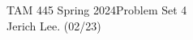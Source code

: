 \documentclass[12pt]{article}
\begin{document}
\noindent TAM 445 Spring 2024\hfill Problem Set 4\\
Jerich Lee. (02/23)

\hrulefill



\end{document}
